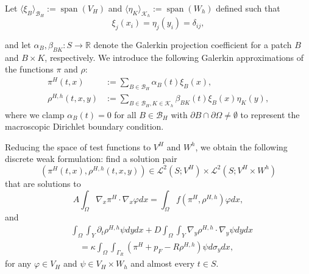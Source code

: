 \documentclass{article}
\renewcommand{\L}{\mathcal{ L}}
\newcommand{\R}{\mathbb{ R}}
\newcommand{\B}{\mathcal{ B}}
\newcommand{\K}{\mathcal{ K}}
\begin{document}
Let $\langle \xi_B \rangle_{\B_H}:= \operatorname{span}(V_H)$ and $ \langle \eta_K \rangle_{\K_h}:= \operatorname{span}(W_h)$ defined such that
\begin{equation}
    \xi_j(x_i) = \eta_j(y_i) = \delta_{ij},
\end{equation}

and let $\alpha_B,\beta_{BK} : S \to \R$ denote the Galerkin projection coefficient for a patch $B$ and $B\times K$, respectively. We introduce the following Galerkin approximations of the functions $\pi$ and $\rho$:
\begin{equation}
    \begin{split}
        \pi^H(t,x) &:= \sum_{B \in \B_H} \alpha_B(t) \xi_B(x),\\
        \rho^{H,h}(t,x,y) &:= \sum_{B \in \B_H, K \in \K_h} \beta_{BK}(t) \xi_B(x) \eta_K(y),
    \end{split}
    \label{eq:trunc}
\end{equation}
where we clamp $\alpha_B(t)=0$ for all $B\in \B_H$ with $\partial B \cap \partial \Omega\neq \emptyset $ to represent the macroscopic Dirichlet boundary condition.

Reducing the space of test functions to $V^H$ and $W^h$, we obtain the following discrete weak formulation: find a solution pair
\[(\pi^H(t,x),\rho^{H,h}(t,x,y)) \in \L^2(S;V^H)\times \L^2(S;V^H\times W^h)\] that are solutions to
\begin{equation}
    \label{eq:weak_pi}
    A\int_\Omega\nabla_x\pi^H\cdot\nabla_x\varphi dx=\int_\Omega f(\pi^H,\rho^{H,h})\varphi dx,
\end{equation}
and
\begin{equation}
    \label{eq:weak_rho}
    \begin{split}
    &\int_\Omega\int_Y\partial_t\rho^{H,h}\psi dydx+D\int_\Omega \int_Y\nabla_y \rho^{H,h}\cdot\nabla_y\psi dydx\\
    &\quad= \kappa\int_\Omega\int_{\Gamma_R}(\pi^H+p_F-R\rho^{H,h})\psi d\sigma_ydx,
    \end{split}
\end{equation}
for any $\varphi \in V_H$ and $\psi \in V_H \times W_h$ and almost every $t \in S$.
\end{document}
